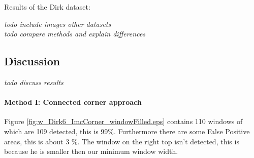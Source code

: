 


Results of the Dirk dataset:\\
\newpage
{}



\emph{todo include images other datasets} \\
\emph{todo compare methods and explain differences}


\subsection{Discussion}  %
\emph{ todo discuss results }

\paragraph{Method I: Connected corner approach} 
Figure \ref{fig:w_Dirk6_ImcCorner_windowFilled.eps} contains 110 windows of which
are 109 detected, this is 99\%. Furthermore there are some False Positive areas,
this is about 3 \%.  The window on the right top isn't detected, this is because
he is smaller then our minimum window width.

